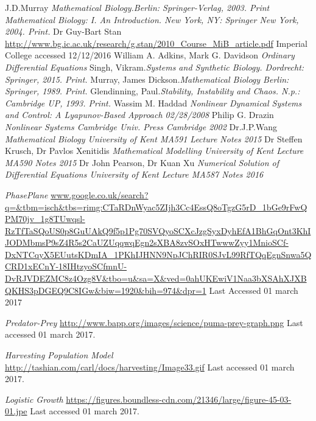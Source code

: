 \documentclass[a4paper]{report}
\theoremstyle{definition}
\begin{document}
\begin{thebibliography}{99}
J.D.Murray \textit{Mathematical Biology.}\emph{Berlin: Springer-Verlag, 2003. Print}
\textit{Mathematical Biology: I. An Introduction. New York, NY: Springer New York, 2004. Print.}
Dr Guy-Bart Stan
\url{http://www.bg.ic.ac.uk/research/g.stan/2010_Course_MiB_article.pdf} Imperial College accessed 12/12/2016
William A. Adkins, Mark G. Davidson\textit{ Ordinary Differential Equations}  
Singh, Vikram.\textit{Systems and Synthetic Biology. Dordrecht: Springer, 2015. Print.}
Murray, James Dickson.\textit{Mathematical Biology Berlin: Springer, 1989. Print.}
Glendinning, Paul.\textit{Stability, Instability and Chaos. N.p.: Cambridge UP, 1993. Print.}
Wassim M. Haddad \textit{Nonlinear Dynamical Systems and Control: A Lyapunov-Based Approach 02/28/2008}
Philip G. Drazin \textit{Nonlinear Systems Cambridge Univ. Press Cambridge 2002}
Dr.J.P.Wang \textit{Mathematical Biology University of Kent  MA591 Lecture Notes 2015}
Dr Steffen Krusch, Dr Pavlos Xenitidis  \textit{Mathematical Modelling  University of Kent Lecture MA590 Notes 2015}
Dr John Pearson, Dr Kuan Xu \textit{Numerical Solution of Differential Equations University of Kent Lecture MA587 Notes 2016}

\textit{PhasePlane}
\url{www.google.co.uk/search?q=&tbm=isch&tbs=rimg:CTaRDnWyac5ZIjh3Cc4EssQ8oTgzG5rD_1bGe9rFwQPM70jv_1g8TUwqsl-RzTfTaSQoUS0p8GuUAkQ9f5p1Pg70SVQyoSCXcJzgSyxDyhEfA1BhGqOnt3KhIJODMbmsP9sZ4R5s2CaUZUqqwqEgn2sXBA8zvSOxHTwwwZyy1MnioSCf-DxNTCqyX5EUutsKDmIA_1PKhIJHNN9NpJChRIR0SJvL99RfTQqEgnSnwa5QCRD1xECnY-18IHtzyoSCfmnU-DvRJVDEZMC8z4Ozg8V&tbo=u&sa=X&ved=0ahUKEwiV1Naa3bXSAhXJXBQKHS3pDGEQ9C8IGw&biw=1920&bih=974&dpr=1} Last Accessed 01 march 2017

\textit{Predator-Prey}
\url{http://www.bapp.org/images/science/puma-prey-graph.png} Last accessed 01 march 2017.

\textit{Harvesting Population Model}
\url{http://tashian.com/carl/docs/harvesting/Image33.gif} Last accessed 01 march 2017.


\textit{Logistic Growth}
\url{https://figures.boundless-cdn.com/21346/large/figure-45-03-01.jpe} Last accessed 01 march 2017.

\end{thebibliography}
\end{document}
